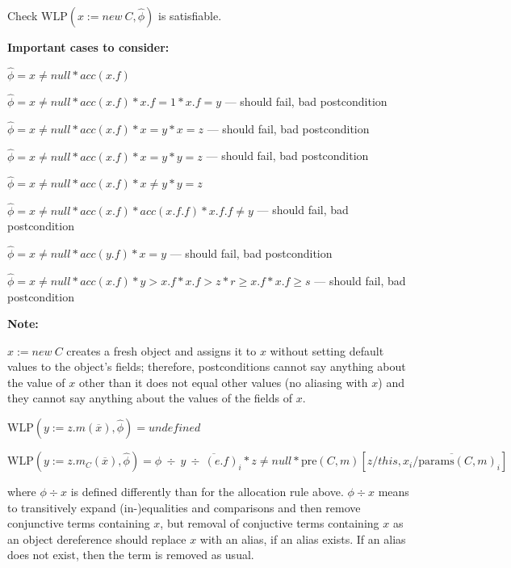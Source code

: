 \documentclass {article}
\newcommand{\fphi}{\widehat{\phi}}
\newcommand{\wlp}[2]{\text{WLP}(#1,#2)}
\begin{document}
Check $\wlp{x := new\ C}{\fphi}$ is satisfiable.

\textbf{Important cases to consider:}

$\fphi = x \neq null \ast acc(x.f)$

$\fphi = x \neq null \ast acc(x.f) \ast x.f = 1 \ast x.f = y$ --- should fail, bad postcondition

$\fphi = x \neq null \ast acc(x.f) \ast x = y \ast x = z$ --- should fail, bad postcondition

$\fphi = x \neq null \ast acc(x.f) \ast x = y \ast y = z$ --- should fail, bad postcondition

$\fphi = x \neq null \ast acc(x.f) \ast x \neq y \ast y = z$

$\fphi = x \neq null \ast acc(x.f) \ast acc(x.f.f) \ast x.f.f \neq y$ --- should fail, bad postcondition

$\fphi = x \neq null \ast acc(y.f) \ast x = y$ --- should fail, bad postcondition

$\fphi = x \neq null \ast acc(x.f) \ast y > x.f \ast x.f > z \ast r \geq x.f \ast x.f \geq s$ --- should fail, bad postcondition


\textbf{Note:}

$x := new \ C$ creates a fresh object and assigns it to $x$ without setting default values to the object's fields; therefore, postconditions cannot say anything about the value of $x$ other than it does not equal other values (no aliasing with $x$) and they cannot say anything about the values of the fields of $x$.

\vspace{0.5cm}

$\wlp{y := z.m(\overline{x})}{\fphi} = undefined$

\vspace{0.5cm}

$\wlp{y := z.m_C(\overline{x})}{\fphi} = \fphi \ \div \ y \overline{\ \div \ (e.f)_i} \ast z \neq null \ast \text{pre}(C,m)\left[z/this, \overline{x_i/\text{params}(C,m)_i}\right]$


where $\phi \div x$ is defined differently than for the allocation rule above. $\phi \div x$ means to transitively expand (in-)equalities and comparisons and then remove conjunctive terms containing $x$, but removal of conjuctive terms containing $x$ as an object dereference should replace $x$ with an alias, if an alias exists. If an alias does not exist, then the term is removed as usual.
\end{document}
